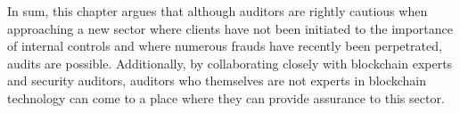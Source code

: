 In sum, this chapter argues that although auditors are rightly cautious when approaching a new sector where clients have not been initiated to the importance of internal controls and where numerous frauds have recently been perpetrated, audits are possible. Additionally, by collaborating closely with blockchain experts and security auditors, auditors who themselves are not experts in blockchain technology can come to a place where they can provide assurance to this sector.




